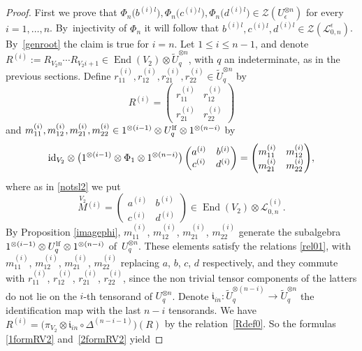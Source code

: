 \documentclass[pdftex]{sigma}%
\numberwithin{equation}{section}
\numberwithin{figure}{section}
\newcommand{\e}{\epsilon}
\newcommand{\Ll}{{\mathcal L}}
\newcommand{\ra}{\rightarrow}
\begin{document}
\begin{proof} First we prove that $\Phi_n\big(b^{(i)l}\big), \Phi_n\big(c^{(i)l}\big), \Phi_n\big(d^{(i)l}\big)\in \mathcal{Z}(U_\epsilon^{\otimes n})$ for every $i=1,\dots,n$. By~injectivity of $\Phi_n$ it will follow that $b^{(i)l}, c^{(i)l}, d^{(i)l}\in \mathcal{Z}(\Ll_{0,n}^\e)$. By~\eqref{genroot} the claim is true for $i=n$. Let $1\leq i\leq n-1$, and denote $R^{(i)}:=R_{V_2n}\cdots R_{V_2i+1} \in \operatorname{End}(V_2)\otimes \tilde U_q^{\otimes n}$, with $q$ an indeterminate, as in the previous sections. Define $r_{11}^{(i)}, r_{12}^{(i)}, r_{21}^{(i)}, r_{22}^{(i)}\in \tilde U_q^{\otimes n}$ by
\[
R^{(i)} =\begin{pmatrix} r_{11}^{(i)}&r_{12}^{(i)}\\[1ex] r_{21}^{(i)}&r_{22}^{(i)}\end{pmatrix}
\]
and $m_{11}^{(i)}, m_{12}^{(i)}, m_{21}^{(i)}, m_{22}^{(i)} \in 1^{\otimes (i-1)} \otimes U_q^{\rm lf} \otimes 1^{\otimes (n-i)}$ by
\[
{\rm id}_{V_2}\otimes \big(1^{\otimes (i-1)} \otimes \Phi_1 \otimes 1^{\otimes (n-i)}\big)\begin{pmatrix} a^{(i)}&b^{(i)}\\ c^{(i)}&d^{(i)}\end{pmatrix} = \begin{pmatrix} m_{11}^{(i)} &m_{12}^{(i)}\\m_{21}^{(i)}&m_{22}^{(i)}\end{pmatrix}\!,
\]
where as in \eqref{notsl2} we put
\[
\stackrel{V_2}{M}{}^{\!\! (i)} =\begin{pmatrix} a^{(i)}&b^{(i)}\\c^{(i)}&d^{(i)}\end{pmatrix}\in \operatorname{End}(V_2)\otimes \Ll_{0,n}^{(i)}.
\]
By Proposition \ref{imagephi}, $m_{11}^{(i)}$, $m_{12}^{(i)}$, $m_{21}^{(i)}$, $m_{22}^{(i)}$ generate the subalgebra $1^{\otimes (i-1)} \otimes U_q^{\rm lf} \otimes 1^{\otimes (n-i)}$ of~$U_q^{\otimes n}$. These elements satisfy the relations \eqref{rel01}, with $m_{11}^{(i)}$, $m_{12}^{(i)}$, $m_{21}^{(i)}$, $m_{22}^{(i)}$ replacing $a$, $b$, $c$, $d$ respectively, and they commute with $r_{11}^{(i)}$, $r_{12}^{(i)}$, $r_{21}^{(i)}$, $r_{22}^{(i)}$, since the non trivial tensor components of the latters do not lie on the $i$-th tensorand of $U_q^{\otimes n}$. Denote $\mathfrak{i}_{in}\colon \tilde U_q^{\otimes (n-i)} \ra \tilde U_q^{\otimes n}$ the identification map with the last $n-i$ tensorands. We have $R^{(i)} = \big(\pi_{V_2}\otimes \mathfrak{i}_{in}\circ \Delta^{(n-i-1)}\big)(R)$ by the relation~\eqref{Rdef0}. So the formulas \eqref{1formRV2} and~\eqref{2formRV2} yield

\end{proof}
\end{document}
